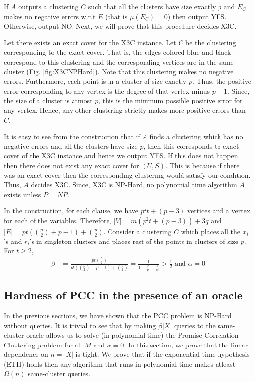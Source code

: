 \documentclass[12pt]{article}
\begin{document}
If $A$ outputs a clustering $C$ such that all the clusters have size exactly $p$ and $E_C$ makes no negative errors w.r.t $E$ (that is $\mu(E_C) = 0$) then output YES. Otherwise, output NO. Next, we will prove that this procedure decides X3C. 

Let there exists an exact cover for the X3C instance. Let $C$ be the clustering corresponding to the exact cover. That is, the edges colored blue and black correspond to this clustering and the corresponding vertices are in the same cluster (Fig. \ref{fig:X3CNPHard}). Note that this clustering makes no negative errors. Furthermore, each point is in a cluster of size exactly $p$. Thus, the positive error corresponding to any vertex is the degree of that vertex minus $p-1$. Since, the size of a cluster is atmost $p$, this is the minimum possible positive error for any vertex. Hence, any other clustering strictly makes more positive errors than $C$. 

It is easy to see from the construction that if $A$ finds a clustering which has no negative errors and all the clusters have size $p$, then this corresponds to exact cover of the X3C instance and hence we output YES. If this does not happen then there does not exist any exact cover for $(U, S)$. This is because if there was an exact cover then the corresponding clustering would satisfy our condition. Thus, $A$ decides X3C. Since, X3C is NP-Hard, no polynomial time algorithm $A$ exists unless $P = NP$.

In the construction, for each clause, we have $p^2 t + (p - 3)$ vertices and a vertex for each of the variables. Therefore, $|V| = m (p^2 t + (p-3)) + 3q$ and $|E| = pt({p \choose 2}+p-1) + {p \choose 2}$.  Consider a clustering $C$ which places all the $x_i$'s  and $r_i$'s in singleton clusters and places rest of the points in clusters of size $p$. For $t \ge 2$,
\begin{align*}
  \beta &= \frac{pt{p \choose 2}}{pt({p \choose 2}+p-1) + {p \choose 2}} = \frac{1}{1 + \frac{2}{p} + \frac{1}{pt}} > \frac{1}{2} \text{ and }\alpha = 0
\end{align*} 

\subsection{Hardness of PCC in the presence of an oracle}
\label{section:PCCNPHardOracle}
In the previous sections, we have shown that the PCC problem is NP-Hard without queries. It is trivial to see that by making $\beta |X|$ queries to the same-cluster oracle allows us to solve (in polynomial time) the Promise Correlation Clustering problem for all $M$ and $\alpha = 0$. In this section, we prove that the linear dependence on $n = |X|$ is tight. We prove that if the exponential time hypothesis (ETH) holds then any algorithm that runs in polynomial time makes atleast $\Omega(n)$ same-cluster queries.
\end{document}
